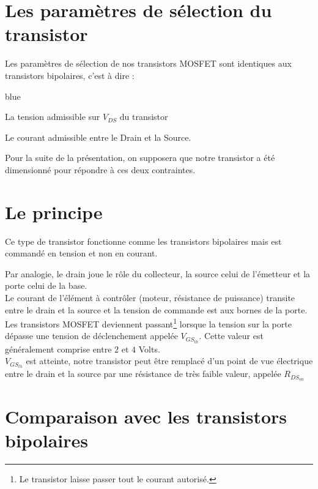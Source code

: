      \section{Les paramètres de sélection du transistor}
     
     Les paramètres de sélection de nos transistors MOSFET sont identiques aux transistors bipolaires, c'est à dire :
     
     \begin{items}{blue}{\Triangle}
     
       \item La tension admissible sur $V_{DS}$ du transistor
       \item Le courant admissible entre le Drain et la Source.
     \end{items}
     
     Pour la suite de la présentation, on supposera que notre transistor a été dimensionné pour répondre à ces deux contraintes.


     \section{Le principe}

     Ce type de transistor fonctionne comme les transistors bipolaires mais est commandé en tension et non en courant.

     Par analogie, le drain joue le rôle du collecteur, la source celui de l'émetteur et la porte celui de la base.\\
     Le courant de l'élément à contrôler (moteur, résistance de puissance) transite entre le drain et la source et la tension de commande est aux bornes de la porte.\\
     
     Les transistors MOSFET deviennent passant\footnote{Le transistor laisse passer tout le courant autorisé.} lorsque la tension sur la porte dépasse une tension de déclenchement appelée $V_{GS_{th}}$.
     Cette valeur est généralement comprise entre $2$ et $4$ Volts.\\

      $V_{GS_{th}}$ est atteinte, notre transistor peut être remplacé d'un point de vue électrique entre le drain et la source par une résistance de très faible valeur, appelée $R_{DS_{on}}$

    \section{Comparaison avec les transistors bipolaires}

